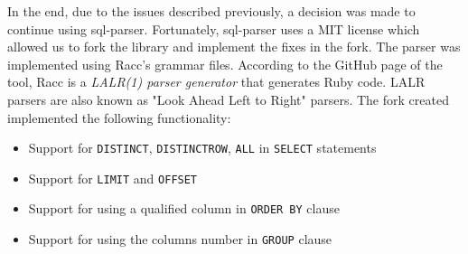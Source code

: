 In the end, due to the issues described previously, a decision was made to continue using sql-parser. Fortunately, sql-parser uses a MIT license which allowed us to fork the library and implement the fixes in the fork. The parser was implemented using Racc's grammar files. According to the GitHub page of the tool, Racc is a \textit{LALR(1) parser generator} that generates Ruby code. LALR parsers are also known as "Look Ahead Left to Right" parsers. The fork created implemented the following functionality:
\begin{itemize}
    \item Support for \texttt{DISTINCT}, \texttt{DISTINCTROW}, \texttt{ALL} in \texttt{SELECT} statements
    \item Support for \texttt{LIMIT} and \texttt{OFFSET}
    \item Support for using a qualified column in \texttt{ORDER BY} clause
    \item Support for using the columns number in \texttt{GROUP} clause
\end{itemize}


